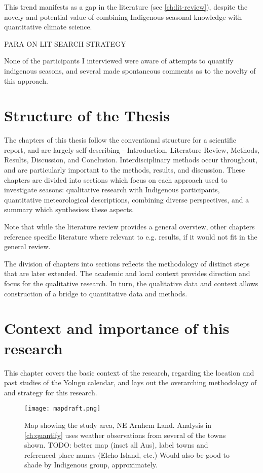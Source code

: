 This trend manifests as a gap in the literature (see \autoref{ch:lit-review}),
despite the novely and potential value of combining Indigenous seasonal knowledge
with quantitative climate science.

PARA ON LIT SEARCH STRATEGY

None of the participants I interviewed were aware of attempts to quantify indigenous seasons,
and several made spontaneous comments as to the novelty of this approach.





\section{Structure of the Thesis}

The chapters of this thesis follow the conventional structure for a scientific
report, and are largely self-describing - Introduction, Literature Review,
Methods, Results, Discussion, and Conclusion.
%
Interdisciplinary methods occur throughout, and are particularly important
to the methods, results, and discussion.  These chapters are divided into
sections which focus on each approach used to investigate seasons:
qualitative research with Indigenous participants,
quantitative meteorological descriptions,
combining diverse perspectives, and
a summary which synthesises these aspects.


Note that while the literature review provides a general overview,
other chapters reference specific literature where relevant to e.g.
results, if it would not fit in the general review.

The division of chapters into sections
reflects the methodology of distinct steps that are
later extended.  The academic and local context provides direction and focus
for the qualitative research.  In turn, the qualitative data and context
allows construction of a bridge to quantitative data and methods.




\section{Context and importance of this research}
\label{ch:context}
This chapter covers the basic context of the research,
regarding the location and past studies of the Yolngu calendar,
and lays out the overarching methodology of and strategy for this research.


\begin{figure}[h]
    \centering
    \texttt{[image: mapdraft.png]}
    \caption[Map showing the study area, NE Arnhem Land]{
        Map showing the study area, NE Arnhem Land.
        Analysis in \autoref{ch:quantify} uses weather observations from several of the towns shown.
        TODO:  better map (inset all Aus), label towns and referenced place names
        (Elcho Island, etc.)
        Would also be good to shade by Indigenous group, approximately.
        }
    \label{fig:arnhem-map}
\end{figure}

